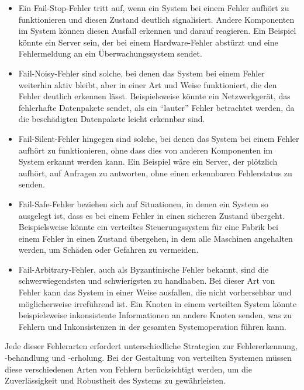 \begin{itemize}
\item Ein Fail-Stop-Fehler tritt auf, wenn ein System bei einem Fehler aufhört zu funktionieren und diesen Zustand deutlich signalisiert. Andere Komponenten im System können diesen Ausfall erkennen und darauf reagieren. Ein Beispiel könnte ein Server sein, der bei einem Hardware-Fehler abstürzt und eine Fehlermeldung an ein Überwachungssystem sendet.

\item Fail-Noisy-Fehler sind solche, bei denen das System bei einem Fehler weiterhin aktiv bleibt, aber in einer Art und Weise funktioniert, die den Fehler deutlich erkennen lässt. Beispielsweise könnte ein Netzwerkgerät, das fehlerhafte Datenpakete sendet, als ein \enquote{lauter} Fehler betrachtet werden, da die beschädigten Datenpakete leicht erkennbar sind.

\item Fail-Silent-Fehler hingegen sind solche, bei denen das System bei einem Fehler aufhört zu funktionieren, ohne dass dies von anderen Komponenten im System erkannt werden kann. Ein Beispiel wäre ein Server, der plötzlich aufhört, auf Anfragen zu antworten, ohne einen erkennbaren Fehlerstatus zu senden.

\item Fail-Safe-Fehler beziehen sich auf Situationen, in denen ein System so ausgelegt ist, dass es bei einem Fehler in einen sicheren Zustand übergeht. Beispielsweise könnte ein verteiltes Steuerungssystem für eine Fabrik bei einem Fehler in einen Zustand übergehen, in dem alle Maschinen angehalten werden, um Schäden oder Gefahren zu vermeiden.

\item Fail-Arbitrary-Fehler, auch als Byzantinische Fehler bekannt, sind die schwerwiegendsten und schwierigsten zu handhaben. Bei dieser Art von Fehler kann das System in einer Weise ausfallen, die nicht vorhersehbar und möglicherweise irreführend ist. Ein Knoten in einem verteilten System könnte beispielsweise inkonsistente Informationen an andere Knoten senden, was zu Fehlern und Inkonsistenzen in der gesamten Systemoperation führen kann.
\end{itemize}
Jede dieser Fehlerarten erfordert unterschiedliche Strategien zur Fehlererkennung, -behandlung und -erholung. Bei der Gestaltung von verteilten Systemen müssen diese verschiedenen Arten von Fehlern berücksichtigt werden, um die Zuverlässigkeit und Robustheit des Systems zu gewährleisten.

